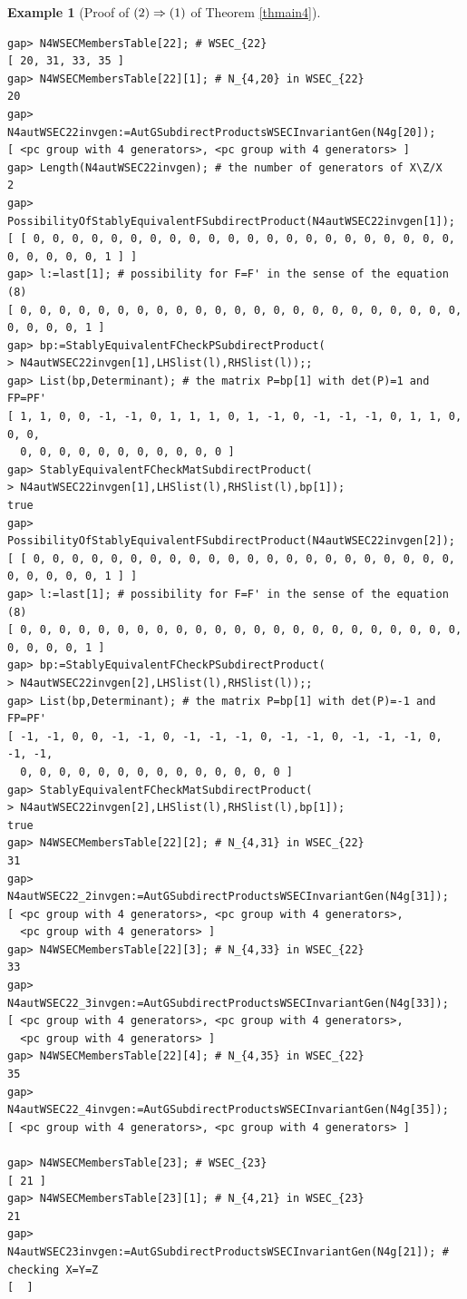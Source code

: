 \documentclass{amsart}
\theoremstyle{plain}
\theoremstyle{definition}
\newtheorem{example}[theorem]{Example}
\theoremstyle{remark}
\begin{document}
\begin{example}[Proof of ${\rm (2)}\Rightarrow {\rm (1)}$ of {Theorem \ref{thmain4}}]
\begin{verbatim}
gap> N4WSECMembersTable[22]; # WSEC_{22}
[ 20, 31, 33, 35 ]
gap> N4WSECMembersTable[22][1]; # N_{4,20} in WSEC_{22}
20
gap> N4autWSEC22invgen:=AutGSubdirectProductsWSECInvariantGen(N4g[20]);
[ <pc group with 4 generators>, <pc group with 4 generators> ]
gap> Length(N4autWSEC22invgen); # the number of generators of X\Z/X
2
gap> PossibilityOfStablyEquivalentFSubdirectProduct(N4autWSEC22invgen[1]);
[ [ 0, 0, 0, 0, 0, 0, 0, 0, 0, 0, 0, 0, 0, 0, 0, 0, 0, 0, 0, 0, 0, 0, 0, 0, 0, 0, 0, 1 ] ]
gap> l:=last[1]; # possibility for F=F' in the sense of the equation (8)
[ 0, 0, 0, 0, 0, 0, 0, 0, 0, 0, 0, 0, 0, 0, 0, 0, 0, 0, 0, 0, 0, 0, 0, 0, 0, 0, 0, 1 ]
gap> bp:=StablyEquivalentFCheckPSubdirectProduct(
> N4autWSEC22invgen[1],LHSlist(l),RHSlist(l));;
gap> List(bp,Determinant); # the matrix P=bp[1] with det(P)=1 and FP=PF'
[ 1, 1, 0, 0, -1, -1, 0, 1, 1, 1, 0, 1, -1, 0, -1, -1, -1, 0, 1, 1, 0, 0, 0, 
  0, 0, 0, 0, 0, 0, 0, 0, 0, 0, 0 ]
gap> StablyEquivalentFCheckMatSubdirectProduct(
> N4autWSEC22invgen[1],LHSlist(l),RHSlist(l),bp[1]);
true
gap> PossibilityOfStablyEquivalentFSubdirectProduct(N4autWSEC22invgen[2]);
[ [ 0, 0, 0, 0, 0, 0, 0, 0, 0, 0, 0, 0, 0, 0, 0, 0, 0, 0, 0, 0, 0, 0, 0, 0, 0, 0, 0, 1 ] ]
gap> l:=last[1]; # possibility for F=F' in the sense of the equation (8)
[ 0, 0, 0, 0, 0, 0, 0, 0, 0, 0, 0, 0, 0, 0, 0, 0, 0, 0, 0, 0, 0, 0, 0, 0, 0, 0, 0, 1 ]
gap> bp:=StablyEquivalentFCheckPSubdirectProduct(
> N4autWSEC22invgen[2],LHSlist(l),RHSlist(l));;
gap> List(bp,Determinant); # the matrix P=bp[1] with det(P)=-1 and FP=PF'
[ -1, -1, 0, 0, -1, -1, 0, -1, -1, -1, 0, -1, -1, 0, -1, -1, -1, 0, -1, -1, 
  0, 0, 0, 0, 0, 0, 0, 0, 0, 0, 0, 0, 0, 0 ]
gap> StablyEquivalentFCheckMatSubdirectProduct(
> N4autWSEC22invgen[2],LHSlist(l),RHSlist(l),bp[1]);
true
gap> N4WSECMembersTable[22][2]; # N_{4,31} in WSEC_{22}
31
gap> N4autWSEC22_2invgen:=AutGSubdirectProductsWSECInvariantGen(N4g[31]);
[ <pc group with 4 generators>, <pc group with 4 generators>, 
  <pc group with 4 generators> ]
gap> N4WSECMembersTable[22][3]; # N_{4,33} in WSEC_{22}
33
gap> N4autWSEC22_3invgen:=AutGSubdirectProductsWSECInvariantGen(N4g[33]);
[ <pc group with 4 generators>, <pc group with 4 generators>, 
  <pc group with 4 generators> ]
gap> N4WSECMembersTable[22][4]; # N_{4,35} in WSEC_{22}
35
gap> N4autWSEC22_4invgen:=AutGSubdirectProductsWSECInvariantGen(N4g[35]);
[ <pc group with 4 generators>, <pc group with 4 generators> ]

gap> N4WSECMembersTable[23]; # WSEC_{23}
[ 21 ]
gap> N4WSECMembersTable[23][1]; # N_{4,21} in WSEC_{23}
21
gap> N4autWSEC23invgen:=AutGSubdirectProductsWSECInvariantGen(N4g[21]); # checking X=Y=Z
[  ]


\end{verbatim}
\end{example}
\end{document}
